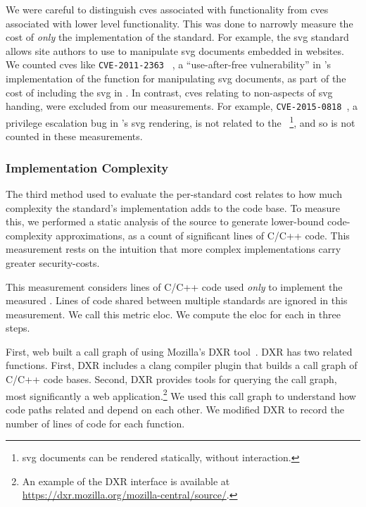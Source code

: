 We were careful to distinguish \gls{cve}s associated with \WAPI functionality
from \gls{cve}s associated with lower level functionality.  This was done to
narrowly measure the cost of \textit{only} the \WAPI implementation of the
standard.  For example, the \gls{svg} standard~\cite{svg2011standard} allows
site authors to use \JS to manipulate \gls{svg} documents embedded in websites.
We counted \gls{cve}s like \texttt{CVE-2011-2363}~\cite{cve_2011_2363} , a
``use-after-free vulnerability'' in \FF's implementation of the \JS function
for manipulating \gls{svg} documents, as part of the cost of including the
\gls{svg} \WAS in \FF.  In contrast, \gls{cve}s relating to non-\WAPI aspects
of \gls{svg} handing, were excluded from our measurements.  For example,
\texttt{CVE-2015-0818}~\cite{cve_2015_0818}, a privilege escalation bug in
\FF's \gls{svg} rendering, is not related to the \WAPI~\footnote{\gls{svg}
documents can be rendered statically, without \JS interaction.}, and so is not
counted in these measurements.


\subsubsection{Implementation Complexity}
\label{cost-benefit:methodology:costs-loc}
The third method used to evaluate the per-standard cost relates to
how much complexity the standard's implementation adds to the code base.  To
measure this, we performed a static analysis of the \FF source to generate
lower-bound code-complexity approximations, as a count of significant lines of
C/C++ code.  This measurement rests on the intuition that more complex
implementations carry greater security-costs.

This measurement considers lines of C/C++ code used \emph{only} to implement
the measured \WAS.  Lines of code shared between multiple standards are ignored
in this measurement.  We call this metric \gls{eloc}.  We compute the
\gls{eloc} for each \WAS in three steps.

First, web built a call graph of \FF using Mozilla's DXR tool~\cite{dxr}.
DXR has two related functions. First, DXR includes a clang compiler plugin that
builds a call graph of C/C++ code bases.  Second, DXR provides tools for
querying the call graph, most significantly a web application.\footnote{An
example of the DXR interface is available at
\url{https://dxr.mozilla.org/mozilla-central/source/}.} We used this call graph
to understand how code paths related and depend on each other.  We modified DXR
to record the number of lines of code for each function.

